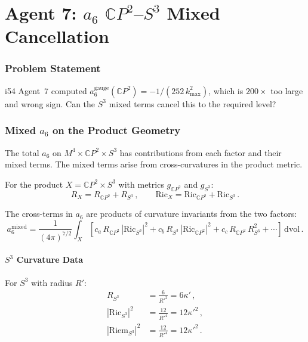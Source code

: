 \documentclass[11pt,a4paper]{article}
\newcommand{\CP}{\mathbb{C}P}
\begin{document}
\part{Agent 7: $a_6$ $\CP^2$--$S^3$ Mixed Cancellation}
\label{part:a6-cancellation}

\section{Problem Statement}

i54 Agent~7 computed $a_6^{\mathrm{gauge}}(\CP^2) = -1/(252\,k_{\max}^2)$, which is $200\times$ too large and wrong sign. Can the $S^3$ mixed terms cancel this to the required level?

\section{Mixed $a_6$ on the Product Geometry}

The total $a_6$ on $M^4 \times \CP^2 \times S^3$ has contributions from each factor and their mixed terms. The mixed terms arise from cross-curvatures in the product metric.

For the product $X = \CP^2 \times S^3$ with metrics $g_{\CP^2}$ and $g_{S^3}$:
\begin{equation}
R_{X} = R_{\CP^2} + R_{S^3}\,,\qquad \mathrm{Ric}_X = \mathrm{Ric}_{\CP^2} + \mathrm{Ric}_{S^3}\,.
\end{equation}

The cross-terms in $a_6$ are products of curvature invariants from the two factors:
\begin{equation}
a_6^{\mathrm{mixed}} = \frac{1}{(4\pi)^{7/2}} \int_X \left[c_a\,R_{\CP^2}\,|\mathrm{Ric}_{S^3}|^2 + c_b\,R_{S^3}\,|\mathrm{Ric}_{\CP^2}|^2 + c_c\,R_{\CP^2}\,R_{S^3}^2 + \cdots\right]\,\mathrm{dvol}\,.
\end{equation}

\subsection{$S^3$ Curvature Data}

For $S^3$ with radius $R'$:
\begin{align}
R_{S^3} &= \frac{6}{R'^2} = 6\kappa'\,, \\
|\mathrm{Ric}_{S^3}|^2 &= \frac{12}{R'^4} = 12\kappa'^2\,, \\
|\mathrm{Riem}_{S^3}|^2 &= \frac{12}{R'^4} = 12\kappa'^2\,.
\end{align}
\end{document}
